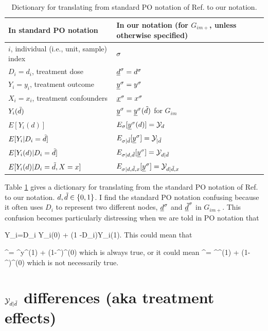 \begin{table}[h!]
\renewcommand{\arraystretch}{1.5}
\centering
\begin{tabular}{|l|l|}
\hline
\rowcolor[HTML]{ECF4FF} 
In standard PO notation&
In our notation 
(for $G_{im+}$, unless otherwise specified)\\
\hline
$i$, individual (i.e., unit, sample) index& $\sigma$ \\ 
\hline 
$D_i=d_i$, treatment dose & ${\underline{d}}^\sigma=d^\sigma$\\
\hline 
$Y_i=y_i$, treatment outcome& ${\underline{y}}^\sigma=y^\sigma$ \\ 
\hline 
$X_i=x_i$, treatment confounders& ${\underline{x}}^\sigma=x^\sigma$ \\ 
\hline 
$Y_i({\tilde{d}})$ & ${\underline{y}}^\sigma={\underline{y}}^\sigma({\tilde{d}})$ for $G_{im}$\\
\hline
$E[Y_i(d)]$ & 
$E_{\sigma}[{\underline{y}}^\sigma(d)]={\cal Y}_{d}$ \\
\hline
$E[Y_i|D_i={\tilde{d}}]$ & 
$ E_{\sigma|{\tilde{d}}}[{\underline{y}}^\sigma]={\cal Y}_{|{\tilde{d}}}$\\
\hline
$E[Y_i(d)|D_i={\tilde{d}}]$ & 
$E_{\sigma|d,{\tilde{d}}}[{\underline{y}}^\sigma]={\cal Y}_{d|{\tilde{d}}}$\\
\hline
$E[Y_i(d)|D_i={\tilde{d}}, X=x]$ & 
$E_{\sigma|d,{\tilde{d}},x}[{\underline{y}}^\sigma]={\cal Y}_{d|{\tilde{d}},x}$\\
\hline
\end{tabular}
\caption{Dictionary for 
translating
from standard PO notation
of Ref.\cite{book-mixtape} to our notation.
}
\label{tab-pot-out-dict}
\end{table}
\renewcommand{\arraystretch}{1}

Table \ref{tab-pot-out-dict}
gives a dictionary for 
translating
from the standard PO notation 
of Ref.\cite{book-mixtape}
to our notation. $d,{\tilde{d}}\in \{0,1\}$.
I find
 the standard PO notation 
confusing because it often uses $D_i$
to represent two different nodes, 
${\underline{d}}^\sigma$ and ${\underline{\tilde{d}}}^\sigma$ in $G_{im+}$. This confusion
becomes particularly distressing
when we are told in PO notation that

\beq Y_i=D_i Y_i(0) + (1
-D_i)Y_i(1)\;.\eeq
This could mean that

\beq \rvy^\s= \rvtd^\s y^\s(1) 
+ (1-\rvtd^\s)\rvy^\s(0)\eeq 
which is always true, or
it could mean 
\beq \rvy^\s= \rvd^\s \rvy^\s(1) +
 (1-\rvd^\s)\rvy^\s(0)\eeq
which is not necessarily true.


\section{${\cal Y}_{d|\tilde{d}}$
differences (aka treatment effects)}


